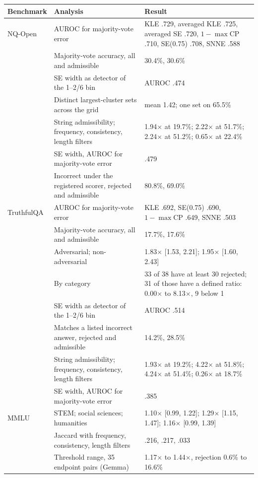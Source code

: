 \begin{table}[h]
\centering
\footnotesize
\begin{tabular}{lp{5.4cm}p{6.2cm}}
\toprule
Benchmark & Analysis & Result \\
\midrule
NQ-Open & AUROC for majority-vote error & KLE .729, averaged KLE .725, averaged SE .720, $1-\max$CP .710, SE(0.75) .708, SNNE .588 \\
 & Majority-vote accuracy, all and admissible & 30.4\%, 30.6\% \\
 & SE width as detector of the 1--2/6 bin & AUROC .474 \\
 & Distinct largest-cluster sets across the grid & mean 1.42; one set on 65.5\% \\
 & String admissibility; frequency, consistency, length filters & 1.94$\times$ at 19.7\%; 2.22$\times$ at 51.7\%; 2.24$\times$ at 51.2\%; 0.65$\times$ at 22.4\% \\
 & SE width, AUROC for majority-vote error & .479 \\
 & Incorrect under the registered scorer, rejected and admissible & 80.8\%, 69.0\% \\
TruthfulQA & AUROC for majority-vote error & KLE .692, SE(0.75) .690, $1-\max$CP .649, SNNE .503 \\
 & Majority-vote accuracy, all and admissible & 17.7\%, 17.6\% \\
 & Adversarial; non-adversarial & 1.83$\times$ [1.53, 2.21]; 1.95$\times$ [1.60, 2.43] \\
 & By category & 33 of 38 have at least 30 rejected; 31 of those have a defined ratio: 0.00$\times$ to 8.13$\times$, 9 below 1 \\
 & SE width as detector of the 1--2/6 bin & AUROC .514 \\
 & Matches a listed incorrect answer, rejected and admissible & 14.2\%, 28.5\% \\
 & String admissibility; frequency, consistency, length filters & 1.93$\times$ at 19.2\%; 4.22$\times$ at 51.8\%; 4.24$\times$ at 51.4\%; 0.26$\times$ at 18.7\% \\
 & SE width, AUROC for majority-vote error & .385 \\
MMLU & STEM; social sciences; humanities & 1.10$\times$ [0.99, 1.22]; 1.29$\times$ [1.15, 1.47]; 1.16$\times$ [0.99, 1.39] \\
 & Jaccard with frequency, consistency, length filters & .216, .217, .033 \\
 & Threshold range, 35 endpoint pairs (Gemma) & 1.17$\times$ to 1.44$\times$, rejection 0.6\% to 16.6\% \\

\end{tabular}
\end{table}

